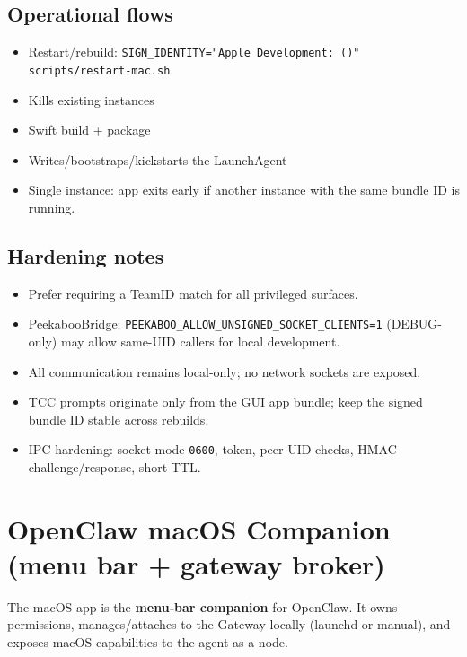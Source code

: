 \subsection{Operational flows}


\begin{itemize}
  \item Restart/rebuild: \texttt{SIGN\_IDENTITY="Apple Development:  ()" scripts/restart-mac.sh}
  \item Kills existing instances
  \item Swift build + package
  \item Writes/bootstraps/kickstarts the LaunchAgent
  \item Single instance: app exits early if another instance with the same bundle ID is running.
\end{itemize}


\subsection{Hardening notes}


\begin{itemize}
  \item Prefer requiring a TeamID match for all privileged surfaces.
  \item PeekabooBridge: \texttt{PEEKABOO\_ALLOW\_UNSIGNED\_SOCKET\_CLIENTS=1} (DEBUG-only) may allow same-UID callers for local development.
  \item All communication remains local-only; no network sockets are exposed.
  \item TCC prompts originate only from the GUI app bundle; keep the signed bundle ID stable across rebuilds.
  \item IPC hardening: socket mode \texttt{0600}, token, peer-UID checks, HMAC challenge/response, short TTL.
\end{itemize}



\clearpage

\section{OpenClaw macOS Companion (menu bar + gateway broker)}


The macOS app is the \textbf{menu‑bar companion} for OpenClaw. It owns permissions,
manages/attaches to the Gateway locally (launchd or manual), and exposes macOS
capabilities to the agent as a node.

